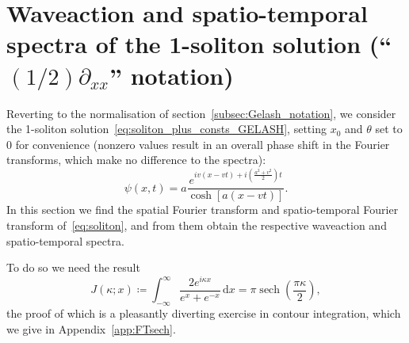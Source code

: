 \documentclass[11pt,a4paper]{article}
\DeclareMathOperator{\sech}{sech}
\begin{document}
\section{Waveaction and spatio-temporal spectra of the 1-soliton solution (``$(1/2)\partial_{xx}$'' notation)}

Reverting to the normalisation of section~\ref{subsec:Gelash_notation}, we consider the 1-soliton solution~\eqref{eq:soliton_plus_consts_GELASH}, setting $x_0$ and $\theta$ set to $0$ for convenience (nonzero values result in an overall phase shift in the Fourier transforms, which make no difference to the spectra):
\begin{equation}
	\label{eq:soliton}
	\psi(x ,t) = a \frac{e^{iv(x-vt) + i(\frac{a^2+v^2}{2})t}}{\cosh\left[ a(x-vt) \right]}.
\end{equation}
In this section we find the spatial Fourier transform and  spatio-temporal Fourier transform of~\eqref{eq:soliton}, and from them obtain the respective waveaction and spatio-temporal spectra. 

To do so we need the result
\begin{equation}
	\label{eq:FTsech}
	J(\kappa ; x)   
	\coloneqq   \int_{-\infty}^\infty    \frac{2e^{i\kappa x}}{e^x+e^{-x}}  \,\mathrm{d}x
	= \pi\sech\left( \frac{\pi \kappa }{2}\right),
\end{equation}
the proof of which is a pleasantly diverting exercise in contour integration, which we give in Appendix~\ref{app:FTsech}.
\end{document}
